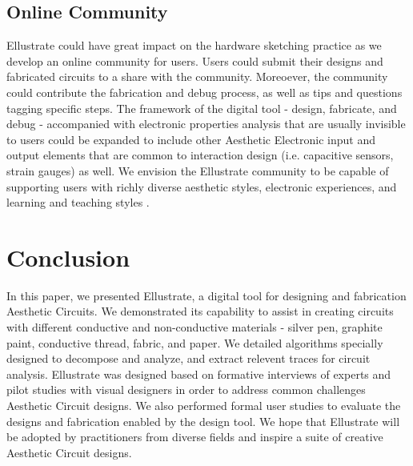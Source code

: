 \documentclass{sigchi}
\begin{document}
\subsection{Online Community}
Ellustrate could have great impact on the hardware sketching practice as we develop an online community for users. Users could submit their designs and fabricated circuits to a share with the community. Moreoever, the community could contribute the fabrication and debug process, as well as tips and questions tagging specific steps. The framework of the digital tool - design, fabricate, and debug - accompanied with electronic properties analysis that are usually invisible to users could be expanded to include other Aesthetic Electronic input and output elements that are common to interaction design (i.e. capacitive sensors, strain gauges) as well. We envision the Ellustrate community to be capable of supporting users with richly diverse aesthetic styles, electronic experiences, and learning and teaching styles .

\section {Conclusion}
In this paper, we presented Ellustrate, a digital tool for designing and fabrication Aesthetic Circuits. We demonstrated its capability to assist in creating circuits with different conductive and non-conductive materials - silver pen, graphite paint, conductive thread, fabric, and paper. We detailed algorithms specially designed to decompose and analyze, and extract relevent traces for circuit analysis. Ellustrate was designed based on formative interviews of experts and pilot studies with visual designers in order to address common challenges Aesthetic Circuit designs. We also performed formal user studies to evaluate the designs and fabrication enabled by the design tool. We hope that Ellustrate will be adopted by practitioners from diverse fields and inspire a suite of creative Aesthetic Circuit designs.

\balance



\end{document}
